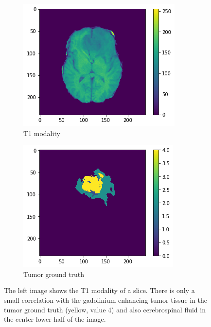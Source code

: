 \begin{figure}[H]
    \centering
    \begin{subfigure}{.5\textwidth}
        \centering
        \includegraphics[width=\linewidth]{chapters/04_segmentation/images/medical_background/t1.png}
        \caption{T1 modality}
    \end{subfigure}%
    \begin{subfigure}{.5\textwidth}
        \centering
        \includegraphics[width=\linewidth]{chapters/04_segmentation/images/medical_background/tumor.png}
        \caption{Tumor ground truth}
    \end{subfigure}
    \caption{The left image shows the T1 modality of a slice. There is only a small correlation with the gadolinium-enhancing tumor tissue in the tumor ground truth (yellow, value 4) and also cerebrospinal fluid in the center lower half of the image.}
    \label{medical_background_t1}
\end{figure}



